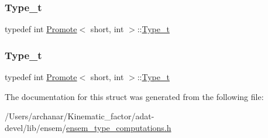 \subsubsection{\texorpdfstring{Type\_t}{Type\_t}\hspace{0.1cm}{\footnotesize\ttfamily [2/3]}}
{\footnotesize\ttfamily typedef int \mbox{\hyperlink{structPromote}{Promote}}$<$ short, int $>$\+::\mbox{\hyperlink{structPromote_3_01short_00_01int_01_4_a4c576886bac5096bb59339397d07ab38}{Type\+\_\+t}}}

\mbox{\label{structPromote_3_01short_00_01int_01_4_a4c576886bac5096bb59339397d07ab38}} 
\subsubsection{\texorpdfstring{Type\_t}{Type\_t}\hspace{0.1cm}{\footnotesize\ttfamily [3/3]}}
{\footnotesize\ttfamily typedef int \mbox{\hyperlink{structPromote}{Promote}}$<$ short, int $>$\+::\mbox{\hyperlink{structPromote_3_01short_00_01int_01_4_a4c576886bac5096bb59339397d07ab38}{Type\+\_\+t}}}



The documentation for this struct was generated from the following file\+:\begin{DoxyCompactItemize}
\item 
/\+Users/archanar/\+Kinematic\+\_\+factor/adat-\/devel/lib/ensem/\mbox{\hyperlink{adat-devel_2lib_2ensem_2ensem__type__computations_8h}{ensem\+\_\+type\+\_\+computations.\+h}}\end{DoxyCompactItemize}
